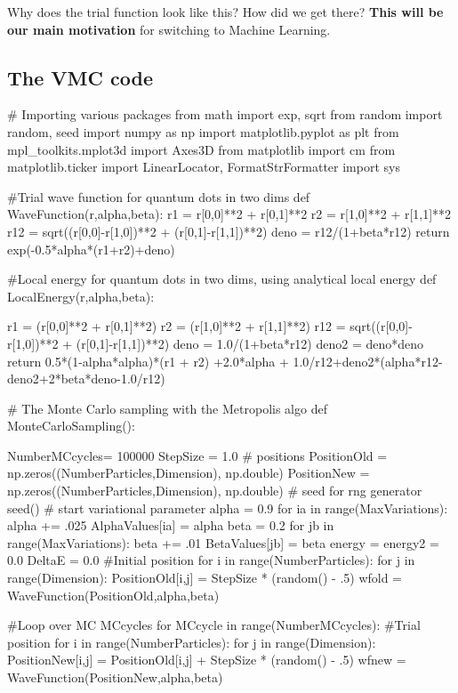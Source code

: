 \documentclass[%
oneside,                 %
final,                   %
10pt]{article}
\begin{document}
Why does the trial function look like this? How did we get there? \textbf{This will be our main motivation} for switching to
Machine Learning.




\subsection{The VMC code}

\bpycod
# Importing various packages
from math import exp, sqrt
from random import random, seed
import numpy as np
import matplotlib.pyplot as plt
from mpl_toolkits.mplot3d import Axes3D
from matplotlib import cm
from matplotlib.ticker import LinearLocator, FormatStrFormatter
import sys

#Trial wave function for quantum dots in two dims
def WaveFunction(r,alpha,beta):
    r1 = r[0,0]**2 + r[0,1]**2
    r2 = r[1,0]**2 + r[1,1]**2
    r12 = sqrt((r[0,0]-r[1,0])**2 + (r[0,1]-r[1,1])**2)
    deno = r12/(1+beta*r12)
    return exp(-0.5*alpha*(r1+r2)+deno)

#Local energy  for quantum dots in two dims, using analytical local energy
def LocalEnergy(r,alpha,beta):
    
    r1 = (r[0,0]**2 + r[0,1]**2)
    r2 = (r[1,0]**2 + r[1,1]**2)
    r12 = sqrt((r[0,0]-r[1,0])**2 + (r[0,1]-r[1,1])**2)
    deno = 1.0/(1+beta*r12)
    deno2 = deno*deno
    return 0.5*(1-alpha*alpha)*(r1 + r2) +2.0*alpha + 1.0/r12+deno2*(alpha*r12-deno2+2*beta*deno-1.0/r12)

# The Monte Carlo sampling with the Metropolis algo
def MonteCarloSampling():

    NumberMCcycles= 100000
    StepSize = 1.0
    # positions
    PositionOld = np.zeros((NumberParticles,Dimension), np.double)
    PositionNew = np.zeros((NumberParticles,Dimension), np.double)
    # seed for rng generator
    seed()
    # start variational parameter
    alpha = 0.9
    for ia in range(MaxVariations):
        alpha += .025
        AlphaValues[ia] = alpha
        beta = 0.2 
        for jb in range(MaxVariations):
            beta += .01
            BetaValues[jb] = beta
            energy = energy2 = 0.0
            DeltaE = 0.0
            #Initial position
            for i in range(NumberParticles):
                for j in range(Dimension):
                    PositionOld[i,j] = StepSize * (random() - .5)
            wfold = WaveFunction(PositionOld,alpha,beta)

            #Loop over MC MCcycles
            for MCcycle in range(NumberMCcycles):
                #Trial position
                for i in range(NumberParticles):
                    for j in range(Dimension):
                        PositionNew[i,j] = PositionOld[i,j] + StepSize * (random() - .5)
                wfnew = WaveFunction(PositionNew,alpha,beta)
\end{document}
